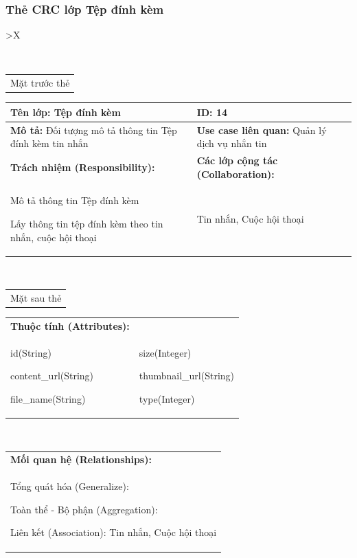   \subsubsection{Thẻ CRC lớp Tệp đính kèm}
  \begin{xltabular}{\textwidth}{
    >{\centering\arraybackslash}X 
  }
  \caption{\bfseries \fontsize{12pt}{0pt}\selectfont Thẻ CRC lớp Tệp đính kèm}
  \\
  \begin{tabularx}{0.9\textwidth}{X}
    Mặt trước thẻ
  \end{tabularx}
  \begin{tabularx}{0.9\textwidth}{|X|X|}
    \hline
    \textbf{Tên lớp:} Tệp đính kèm & \textbf{ID:} 14 \\
    \hline
    \textbf{Mô tả:} Đối tượng mô tả thông tin Tệp đính kèm tin nhắn & \textbf{Use case liên quan:} Quản lý dịch vụ nhắn tin \\
    \hline
    \textbf{Trách nhiệm (Responsibility):} & \textbf{Các lớp cộng tác (Collaboration):} \\
    Mô tả thông tin Tệp đính kèm

    Lấy thông tin tệp đính kèm theo tin nhắn, cuộc hội thoại
    & 
    Tin nhắn, Cuộc hội thoại
    \\
    \hline
  \end{tabularx}
  \\ 
  \begin{tabularx}{0.9\textwidth}{X}
    Mặt sau thẻ
  \end{tabularx} 
  \begin{tabularx}{0.9\textwidth}{|X|X|}
    \hline
    \textbf{Thuộc tính (Attributes):} & \\
    id(String) 

    content\_url(String)
    
    file\_name(String)
    &
    size(Integer)

    thumbnail\_url(String)

    type(Integer)
    \\
    \hline
  \end{tabularx}
  \\     
  \begin{tabularx}{0.9\textwidth}{|X|}
    \textbf{Mối quan hệ (Relationships):} \\
    Tổng quát hóa (Generalize):  

    Toàn thể - Bộ phận (Aggregation): 
    
    Liên kết (Association): Tin nhắn, Cuộc hội thoại 
    \\
    \hline
  \end{tabularx}
  \end{xltabular}


